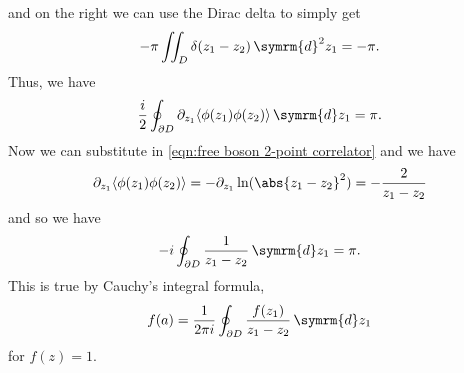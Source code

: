 \documentclass[fleqn]{NotesClass}
\renewcommand{\dd}[1]{\,\symrm{d}#1}
\DeclarePairedDelimiter{\correlator}{\langle}{\rangle}
\begin{document}
    and on the right we can use the Dirac delta to simply get
    \begin{equation}
        -\pi \iint_D \delta(z_1 - z_2) \dd{^2z_1} = -\pi.
    \end{equation}
    Thus, we have
    \begin{equation}
        \frac{i}{2}\oint_{\partial D} \partial_{z_1} \correlator{\phi(z_1)\phi(z_2)} \dd{z_1} = \pi.
    \end{equation}
    Now we can substitute in \cref{eqn:free boson 2-point correlator} and we have
    \begin{equation}
        \partial_{z_1} \correlator{\phi(z_1)\phi(z_2)} = - \partial_{z_1} \ln(\abs{z_1 - z_2}^2) = -\frac{2}{z_1 - z_2}
    \end{equation}
    and so we have
    \begin{equation}
        -i \oint_{\partial D} \frac{1}{z_1 - z_2} \dd{z_1} = \pi.
    \end{equation}
    This is true by Cauchy's integral formula,
    \begin{equation}
        f(a) = \frac{1}{2\pi i} \oint_{\partial D} \frac{f(z_1)}{z_1 - z_2} \dd{z_1}
    \end{equation}
    for \(f(z) = 1\).
    
\end{document}
